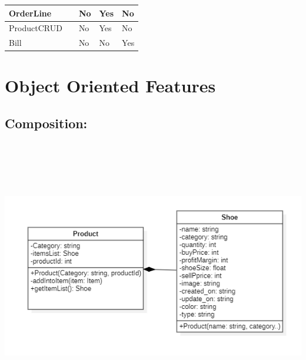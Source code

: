 \documentclass[12pt]{article}
\begin{document}
\begin{table}[H]
\begin{tabular}{|l|l|l|l|l|}
OrderLine        &                  & No                                                              & Yes                                                              & No                                                                                                     \\ \hline
ProductCRUD      &                  & No                                                              & Yes                                                              & No                                                                                                     \\ \hline
Bill             &                  & No                                                              & No                                                               & Yes                                                                                                    \\ \hline
\end{tabular}
\end{table}

\section{Object Oriented Features}
\subsection{Composition:}

\begin{center}
	 \includegraphics[width=170mm,height=120mm]{1.png}
\end{center}
\end{document}
